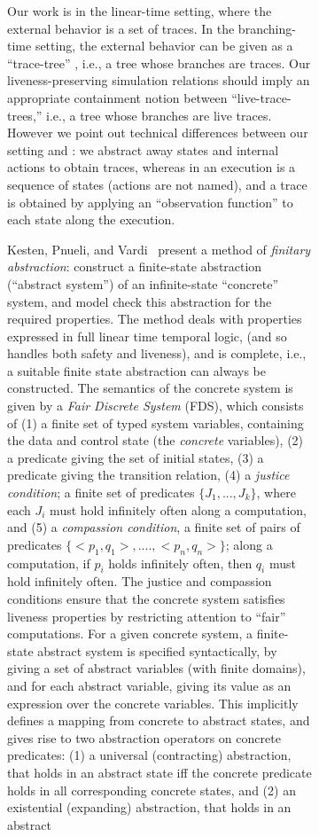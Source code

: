 \documentclass[11pt]{article}
\newcommand{\empi}[1]{\textit{#1\/}}
\begin{document}
\begin{figure}[htb]
\begin{figure}[htb]
Our work is in the linear-time setting, where the external behavior is
a set of traces. In the branching-time setting, the external behavior
can be given as a ``trace-tree'' \cite{HKR97}, i.e., a tree whose
branches are traces. Our liveness-preserving
simulation relations should imply an appropriate containment notion
between ``live-trace-trees,'' i.e., a tree whose branches are live
traces. However we point out technical differences between our setting
and \cite{AH95,HKR97}: we abstract away states and internal actions to
obtain traces, whereas in \cite{AH95,HKR97} an execution is a sequence
of states (actions are not named), and a 
trace is obtained by applying an ``observation function'' to each
state along the execution.

Kesten, Pnueli, and Vardi~\cite{KP00,KPV01} present a method of
\empi{finitary abstraction}: construct a finite-state abstraction (``abstract
system'') of an
infinite-state ``concrete'' system, and model check this abstraction for the
required properties. The method deals with properties expressed in
full linear time temporal logic, (and so handles both safety and
liveness), and is complete, i.e., a suitable finite state abstraction
can always be constructed.
The semantics of the concrete system is given by a \empi{Fair Discrete
System} (FDS), which consists of
(1) a finite set of typed system variables, containing the data and
control state (the \empi{concrete} variables),
(2) a predicate giving the set of initial states, 
(3) a predicate giving the transition relation, 
(4) a \empi{justice condition};  a finite set of predicates $\{J_1,...,J_k\}$,
where each $J_i$ must hold infinitely often along a computation, and
(5) a \empi{compassion condition}, 
a finite set of pairs of predicates $\{<p_1,q_1>,....,<p_n,q_n>\}$;
along a computation, if $p_i$ holds infinitely often, then
$q_i$ must hold infinitely often.
The {justice} and {compassion} conditions ensure that the concrete
system satisfies liveness properties by restricting attention to
``fair'' computations.
For a given concrete system, a finite-state abstract system is
specified syntactically, by giving a set of abstract variables (with
finite domains), and for each abstract variable, giving its value as
an expression over the concrete variables. This implicitly defines a
mapping from concrete to abstract states, and gives rise to two
abstraction operators on concrete predicates: 
(1) a universal (contracting) abstraction, that holds in an abstract
state iff the concrete predicate holds in all corresponding concrete
states, and 
(2) an existential (expanding) abstraction, that holds in an abstract

\end{figure}
\end{figure}
\end{document}
